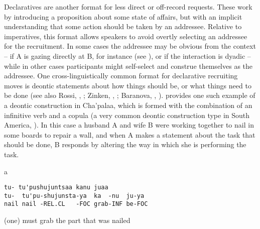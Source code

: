 \documentclass[output=paper]{langsci/langscibook}
\begin{document}
Declaratives are another format for less direct or off-record requests. These work by introducing a proposition about some state of affairs, but with an implicit understanding that some action should be taken by an addressee. Relative to imperatives, this format allows speakers to avoid overtly selecting an addressee for the recruitment. In some cases the addressee may be obvious from the context -- if A is gazing directly at B, for instance (see \citealt{Lerner2003}), or if the interaction is dyadic -- while in other cases participants might self-select and construe themselves as the addressee. One cross-linguistically common format for declarative recruiting moves is deontic statements about how things should be, or what things need to be done (see also Rossi, , ; Zinken, , ; Baranova, , ).  provides one such example of a deontic construction in Cha'palaa, which is formed with the combination of an infinitive verb and a copula (a very common deontic construction type in South America, \citealt{Müller2013}). In this case a husband A and wife B were working together to nail in some boards to repair a wall, and when A makes a statement about the task that should be done, B responds by altering the way in which she is performing the task.

\vspace{-1mm}
%
\begin{mdframednoverticalspace}[style=firstfoc]
\begin{transbox}{1}{a}
\begin{verbatim}
tu- tu'pushujuntsaa kanu juaa
tu-  tu'pu-shujunsta-ya  ka  -nu  ju-ya
nail nail -REL.CL   -FOC grab-INF be-FOC
\end{verbatim}
(one) must grab the part that was nailed
\end{transbox}
\end{mdframednoverticalspace}
%
\begin{mdframednoverticalspace}[style=secondfoc]
\end{mdframednoverticalspace}
\end{document}
